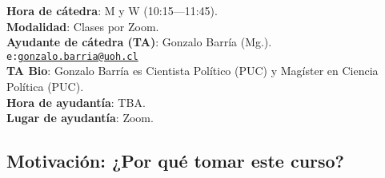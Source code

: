 \documentclass[letterpaper]{article}
\begin{document}
\vspace{5mm}
{\bf Hora de c\'atedra}: M y W (10:15---11:45).\\
{\bf Modalidad}: Clases por Zoom.\\


\vspace{5mm}
{\bf Ayudante de c\'atedra (TA)}: Gonzalo Barr\'ia (Mg.).\\
\texttt{e:}\href{mailto:gonzalo.barria@uoh.cl}{\texttt{gonzalo.barria@uoh.cl}}\\
{\bf TA Bio}: Gonzalo Barr\'ia es Cientista Pol\'itico (PUC) y Mag\'ister en Ciencia Pol\'itica (PUC).\\
{\bf Hora de ayudant\'ia}: TBA.\\
{\bf Lugar de ayudant\'ia}: Zoom.\\





\subsection*{Motivaci\'on: ¿Por qu\'e tomar este curso?}
\end{document}
